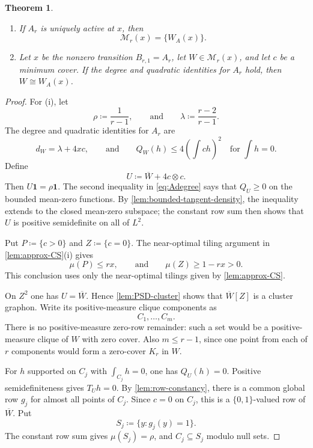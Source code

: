 \documentclass[10pt]{article}
\numberwithin{equation}{section}
\newtheorem{theorem}{Theorem}[section]
\newcommand{\one}{\mathbf 1}
\newcommand{\cM}{\mathcal M}
\begin{document}
\label{sec:Aphase}
\begin{theorem}\label{thm:A-classification}
\begin{enumerate}[label=\textup{(\roman*)}]
\item If $A_r$ is uniquely active at $x$, then
\[
 \cM_r(x)=\{W_A(x)\}.
\]
\item Let $x$ be the nonzero transition $B_{r,1}=A_r$, let $W\in\cM_r(x)$, and let $c$ be a minimum cover.  If the degree and quadratic identities for $A_r$ hold, then $W\cong W_A(x)$.
\end{enumerate}
\end{theorem}

\begin{proof}
For \textup{(i)}, let
\[
 \rho\coloneqq\frac1{r-1},
 \qquad\text{and}\qquad
 \lambda\coloneqq\frac{r-2}{r-1}.
\]
The degree and quadratic identities for $A_r$ are
\begin{equation}\label{eq:Adegree}
 d_W=\lambda+4xc,
 \qquad\text{and}\qquad
 Q_W(h)\le4\left(\int ch\right)^2
 \quad\text{for }\int h=0.
\end{equation}
Define
\[
 U\coloneqq\overline W+4c\otimes c.
\]
Then $U\one=\rho\one$.  The second inequality in \cref{eq:Adegree} says that $Q_U\ge0$ on the bounded mean-zero functions.  By \cref{lem:bounded-tangent-density}, the inequality extends to the closed mean-zero subspace; the constant row sum then shows that $U$ is positive semidefinite on all of $L^2$.

Put $P\coloneqq\{c>0\}$ and $Z\coloneqq\{c=0\}$.  The near-optimal tiling argument in \cref{lem:approx-CS}(i) gives
\begin{equation}\label{eq:positive-support-measure}
 \mu(P)\le rx,
 \qquad\text{and}\qquad
 \mu(Z)\ge1-rx>0.
\end{equation}
This conclusion uses only the near-optimal tilings given by \cref{lem:approx-CS}.

On $Z^2$ one has $U=\overline W$.  Hence \cref{lem:PSD-cluster} shows that $\overline W[Z]$ is a cluster graphon.  Write its positive-measure clique components as
\[
 C_1,\ldots,C_m.
\]
There is no positive-measure zero-row remainder: such a set would be a positive-measure clique of $W$ with zero cover.  Also $m\le r-1$, since one point from each of $r$ components would form a zero-cover $K_r$ in $W$.

For $h$ supported on $C_j$ with $\int_{C_j}h=0$, one has $Q_U(h)=0$.  Positive semidefiniteness gives $T_Uh=0$.  By \cref{lem:row-constancy}, there is a common global row $g_j$ for almost all points of $C_j$.  Since $c=0$ on $C_j$, this is a $\{0,1\}$-valued row of $\overline W$.  Put
\[
 S_j\coloneqq\{y\colon g_j(y)=1\}.
\]
The constant row sum gives $\mu(S_j)=\rho$, and $C_j\subseteq S_j$ modulo null sets.


\end{proof}
\end{document}
